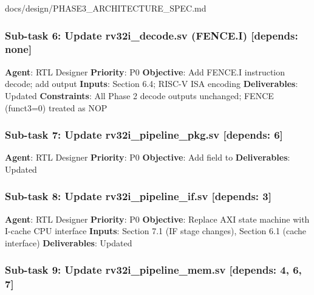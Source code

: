 \begin{relocated}{docs/design/PHASE3_ARCHITECTURE_SPEC.md}
\subsubsection{\texorpdfstring{Sub-task 6: Update
rv32i\_\allowbreak{}decode.sv (FENCE.I) {[}depends:
none{]}}{Sub-task 6: Update rv32i\_decode.sv (FENCE.I) {[}depends: none{]}}}\label{ds:ch:phase3-architecture:sub-task-6-update-rv32i-decodesv-fencei-depends-none}

\textbf{Agent}: RTL Designer \textbf{Priority}: P0 \textbf{Objective}:
Add FENCE.I instruction decode; add  output
\textbf{Inputs}: Section 6.4; RISC-V ISA encoding \textbf{Deliverables}:
Updated  \textbf{Constraints}: All
Phase 2 decode outputs unchanged; FENCE (funct3=0) treated as NOP

\subsubsection{\texorpdfstring{Sub-task 7: Update
rv32i\_\allowbreak{}pipeline\_\allowbreak{}pkg.sv {[}depends:
6{]}}{Sub-task 7: Update rv32i\_pipeline\_pkg.sv {[}depends: 6{]}}}\label{ds:ch:phase3-architecture:sub-task-7-update-rv32i-pipeline-pkgsv-depends-6}

\textbf{Agent}: RTL Designer \textbf{Priority}: P0 \textbf{Objective}:
Add  field to  \textbf{Deliverables}:
Updated 

\subsubsection{\texorpdfstring{Sub-task 8: Update
rv32i\_\allowbreak{}pipeline\_\allowbreak{}if.sv {[}depends:
3{]}}{Sub-task 8: Update rv32i\_pipeline\_if.sv {[}depends: 3{]}}}\label{ds:ch:phase3-architecture:sub-task-8-update-rv32i-pipeline-ifsv-depends-3}

\textbf{Agent}: RTL Designer \textbf{Priority}: P0 \textbf{Objective}:
Replace AXI state machine with I-cache CPU interface \textbf{Inputs}:
Section 7.1 (IF stage changes), Section 6.1 (cache interface)
\textbf{Deliverables}: Updated

\subsubsection{\texorpdfstring{Sub-task 9: Update
rv32i\_\allowbreak{}pipeline\_\allowbreak{}mem.sv {[}depends: 4, 6,
7{]}}{Sub-task 9: Update rv32i\_pipeline\_mem.sv {[}depends: 4, 6, 7{]}}}\label{ds:ch:phase3-architecture:sub-task-9-update-rv32i-pipeline-memsv-depends-4-6-7}


\end{relocated}
